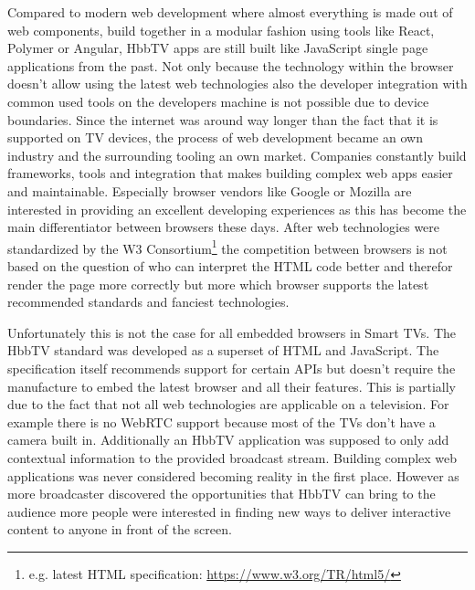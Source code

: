Compared to modern web development where almost everything is made out of web components, build together in a modular fashion using tools like React, Polymer or Angular, HbbTV apps are still built like JavaScript single page applications from the past. Not only because the technology within the browser doesn't allow using the latest web technologies also the developer integration with common used tools on the developers machine is not possible due to device boundaries. Since the internet was around way longer than the fact that it is supported on TV devices, the process of web development became an own industry and the surrounding tooling an own market. Companies constantly build frameworks, tools and integration that makes building complex web apps easier and maintainable. Especially browser vendors like Google or Mozilla are interested in providing an excellent developing experiences as this has become the main differentiator between browsers these days. After web technologies were standardized by the W3 Consortium\footnote{e.g. latest HTML specification: \url{https://www.w3.org/TR/html5/}} the competition between browsers is not based on the question of who can interpret the HTML code better and therefor render the page more correctly but more which browser supports the latest recommended standards and fanciest technologies.

Unfortunately this is not the case for all embedded browsers in Smart TVs. The HbbTV standard was developed as a superset of HTML and JavaScript. The specification itself recommends support for certain APIs but doesn't require the manufacture to embed the latest browser and all their features. This is partially due to the fact that not all web technologies are applicable on a television. For example there is no WebRTC support because most of the TVs don't have a camera built in. Additionally an HbbTV application was supposed to only add contextual information to the provided broadcast stream. Building complex web applications was never considered becoming reality in the first place. However as more broadcaster discovered the opportunities that HbbTV can bring to the audience more people were interested in finding new ways to deliver interactive content to anyone in front of the screen.

